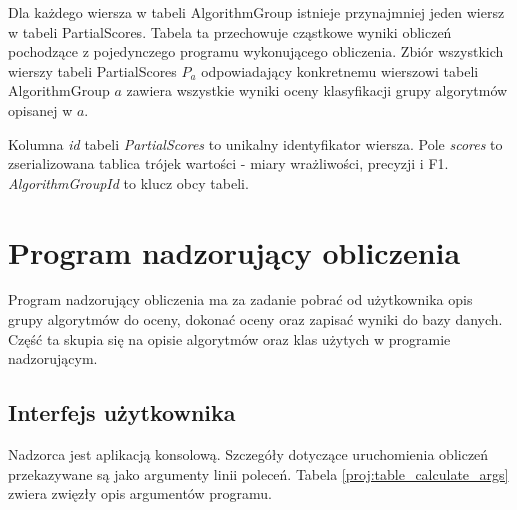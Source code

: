 \documentclass[../thesis.tex]{subfiles}
\begin{document}
Dla każdego wiersza w tabeli AlgorithmGroup istnieje przynajmniej jeden wiersz w tabeli PartialScores. Tabela ta przechowuje cząstkowe wyniki obliczeń pochodzące z pojedynczego programu wykonującego obliczenia. Zbiór wszystkich wierszy tabeli PartialScores $P_a$ odpowiadający konkretnemu wierszowi tabeli AlgorithmGroup $a$ zawiera wszystkie wyniki oceny klasyfikacji grupy algorytmów opisanej w $a$.

Kolumna \emph{id} tabeli \emph{PartialScores} to unikalny identyfikator wiersza. Pole \emph{scores} to zserializowana tablica trójek wartości - miary wrażliwości, precyzji i F1. \emph{AlgorithmGroupId} to klucz obcy tabeli.

\section{Program nadzorujący obliczenia}
\label{proj:supervisor}

Program nadzorujący obliczenia ma za zadanie pobrać od użytkownika opis grupy algorytmów do oceny, dokonać oceny oraz zapisać wyniki do bazy danych. Część ta skupia się na opisie algorytmów oraz klas użytych w programie nadzorującym.

\subsection{Interfejs użytkownika}

Nadzorca jest aplikacją konsolową. Szczegóły dotyczące uruchomienia obliczeń przekazywane są jako argumenty linii poleceń. Tabela \ref{proj:table_calculate_args} zwiera zwięzły opis argumentów programu. 
\end{document}
